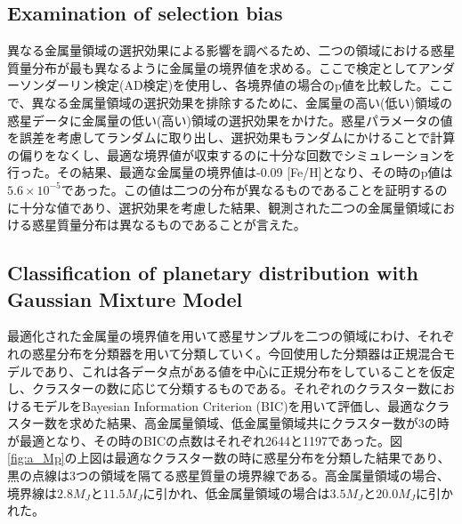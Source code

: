 \documentclass[twocolumn, dvipdfmx]{aastex62}
\begin{document}
\begin{CJK*}{UTF8}{min}
\subsection{Examination of selection bias} \label{subsec:bias}

異なる金属量領域の選択効果による影響を調べるため、二つの領域における惑星質量分布が最も異なるように金属量の境界値を求める。ここで検定としてアンダーソンダーリン検定(AD検定)を使用し、各境界値の場合のp値を比較した。ここで、異なる金属量領域の選択効果を排除するために、金属量の高い(低い)領域の惑星データに金属量の低い(高い)領域の選択効果をかけた。惑星パラメータの値を誤差を考慮してランダムに取り出し、選択効果もランダムにかけることで計算の偏りをなくし、最適な境界値が収束するのに十分な回数でシミュレーションを行った。その結果、最適な金属量の境界値は-0.09 [Fe/H]となり、その時のp値は$5.6\times10^{-5}$であった。この値は二つの分布が異なるものであることを証明するのに十分な値であり、選択効果を考慮した結果、観測された二つの金属量領域における惑星質量分布は異なるものであることが言えた。


\subsection{Classification of planetary distribution with Gaussian Mixture Model} \label{subsec:classification}

最適化された金属量の境界値を用いて惑星サンプルを二つの領域にわけ、それぞれの惑星分布を分類器を用いて分類していく。今回使用した分類器は正規混合モデルであり、これは各データ点がある値を中心に正規分布をしていることを仮定し、クラスターの数に応じて分類するものである。それぞれのクラスター数におけるモデルをBayesian Information Criterion (BIC)を用いて評価し、最適なクラスター数を求めた結果、高金属量領域、低金属量領域共にクラスター数が3の時が最適となり、その時のBICの点数はそれぞれ2644と1197であった。図\ref{fig:a_Mp}の上図は最適なクラスター数の時に惑星分布を分類した結果であり、黒の点線は3つの領域を隔てる惑星質量の境界線である。高金属量領域の場合、境界線は$2.8 M_J$と$11.5 M_J$に引かれ、低金属量領域の場合は$3.5 M_J$と$20.0 M_J$に引かれた。


\end{CJK*}
\end{document}
